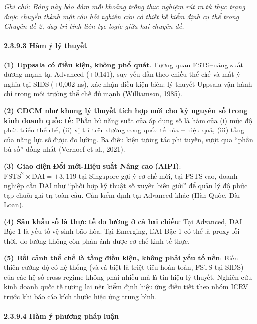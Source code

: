 \documentclass[
  a4paper,
  13pt]{extreport}
\begin{document}
\emph{Ghi chú: Bảng này bảo đảm mỗi khoảng trống thực nghiệm rút ra từ
thực trạng được chuyển thành một câu hỏi nghiên cứu có thiết kế kiểm
định cụ thể trong Chuyên đề 2, duy trì tính liên tục logic giữa hai
chuyên đề.}

\hypertarget{huxe0m-uxfd-luxfd-thuyux1ebft}{%
\paragraph{2.3.9.3 Hàm ý lý
thuyết}\label{huxe0m-uxfd-luxfd-thuyux1ebft}}

\textbf{(1) Uppsala có điều kiện, không phổ quát}: Tương quan FSTS--năng
suất dương mạnh tại Advanced (+0,141), suy yếu dần theo chiều thể chế và
mất ý nghĩa tại SIDS (+0,002 ns), xác nhận điều kiện biên: lý thuyết
Uppsala vận hành chỉ trong môi trường thể chế đủ mạnh (Williamson,
1985).

\textbf{(2) CDCM như khung lý thuyết tích hợp mới cho kỷ nguyên số trong
kinh doanh quốc tế}: Phần bù năng suất của áp dụng số là hàm của (i) mức
độ phát triển thể chế, (ii) vị trí trên đường cong quốc tế hóa -- hiệu
quả, (iii) tầng của năng lực số được đo lường. Ba điều kiện tương tác
phi tuyến, vượt qua ``phần bù số'' đồng nhất (Verhoef et al., 2021).

\textbf{(3) Giao diện Đổi mới-Hiệu suất Nâng cao (AIPI)}:
\(\mathrm{FSTS}^2\times\mathrm{DAI} = +3{,}119\) tại Singapore gợi ý cơ
chế mới, tại FSTS cao, doanh nghiệp cần DAI như ``phối hợp kỹ thuật số
xuyên biên giới'' để quản lý độ phức tạp chuỗi giá trị toàn cầu. Cần
kiểm định tại Advanced khác (Hàn Quốc, Đài Loan).

\textbf{(4) Sân khấu số là thực tế đo lường ở cả hai chiều}: Tại
Advanced, DAI Bậc 1 là yếu tố vệ sinh bão hòa. Tại Emerging, DAI Bậc 1
có thể là proxy lỗi thời, đo lường không còn phản ánh được cơ chế kinh
tế thực.

\textbf{(5) Bối cảnh thể chế là tầng điều kiện, không phải yếu tố nền}:
Biến thiên cường độ có hệ thống (và cá biệt là triệt tiêu hoàn toàn,
FSTS tại SIDS) của các hệ số cross-regime không phải nhiễu mà là tín
hiệu lý thuyết. Nghiên cứu kinh doanh quốc tế tương lai nên kiểm định
hiệu ứng điều tiết theo nhóm ICRV trước khi báo cáo kích thước hiệu ứng
trung bình.

\hypertarget{huxe0m-uxfd-phux1b0ux1a1ng-phuxe1p-luux1eadn}{%
\paragraph{2.3.9.4 Hàm ý phương pháp
luận}\label{huxe0m-uxfd-phux1b0ux1a1ng-phuxe1p-luux1eadn}}
\end{document}
